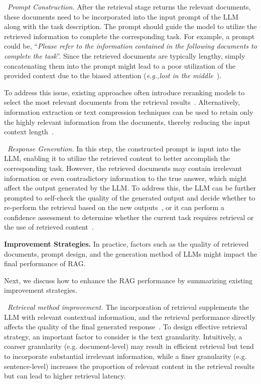 \textbullet~\emph{Prompt Construction.} After the retrieval stage returns the relevant documents, these documents need to be incorporated into the input prompt of the LLM along with the task description. The prompt should guide the model to utilize the retrieved information to complete the corresponding task. For example, a prompt could be, ``\emph{Please refer to the information contained in the following documents to complete the task}''.  Since the retrieved documents are typically lengthy, simply concatenating them into the prompt might lead to a poor utilization of the provided context due to the biased attention (\emph{e.g.,}\emph{lost in the middle}~\cite{Liu-arxiv-2023-Lost}). 

To address this issue, existing approaches often introduce reranking models to select the most relevant documents from the retrieval results~\cite{wang2024rear}. Alternatively, information extraction or text compression techniques can be used to retain only the highly relevant information from the documents, thereby reducing the input context length~\cite{rau2024context, xu2024recomp}.

\textbullet~\emph{Response Generation.} In this step, the constructed prompt is input into the LLM, enabling it to utilize the retrieved content to better accomplish the corresponding task. However, the retrieved documents may contain irrelevant information or even contradictory information to the true answer, which might affect the output generated by the LLM. To address this, the LLM can be further prompted to self-check the quality of the generated output and decide {whether to re-perform the retrieval based on the new outputs~\cite{shao2023enhancing}}, or it can perform a confidence assessment to determine whether the current task requires retrieval or the use of retrieved content~\cite{Jiang-2023-arxiv-Active}.

\textbf{Improvement Strategies.} In practice, factors such as the quality of retrieved documents, prompt design, and the generation method of  LLMs might impact the final performance of RAG.  

Next, we discuss how to enhance the RAG performance by summarizing existing improvement strategies. 

\textbullet~\emph{Retrieval method improvement.} The incorporation of retrieval supplements the LLM with relevant contextual information, and the retrieval performance directly affects the quality of the final generated response~\cite{Ren-arxiv-2023-Investigating}. To design effective retrieval strategy, an important factor to consider is the text granularity. Intuitively, a coarser granularity (e.g. document-level) may result in efficient retrieval but tend to incorporate substantial irrelevant information, while a finer granularity (e.g. sentence-level) increases the proportion of relevant content in the retrieval results but can lead to higher retrieval latency. 

